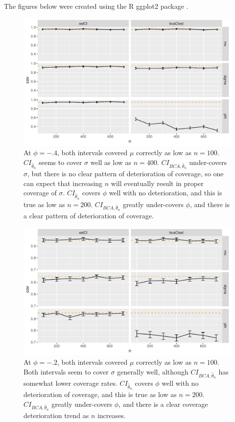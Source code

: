 \documentclass[12pt, letterpaper, titlepage]{article}
\begin{document}
The figures below were created using the R ggplot2 package \citep{ggplot2}.
\begin{figure}[tbp]
  \centering
  \includegraphics[width=\textwidth]{figures/plot_n.4}
  \caption{At $\phi = -.4$, both intervals covered $\mu$ correctly as low as
    $n = 100$. $CI_{\hat{\theta}_{n}}$ seems to cover $\sigma$ well as low as
    $n = 400$. $CI_{BCA, \hat{\theta}_{n}}$ under-covers $\sigma$, but there
    is no clear pattern of deterioration of coverage, so one can expect that
    increasing $n$ will eventually result in proper coverage of $\sigma$.
    $CI_{\hat{\theta}_{n}}$ covers $\phi$ well with no deterioration, and this
    is true as low as $n = 200$. $CI_{BCA, \hat{\theta}_{n}}$ greatly
    under-covers $\phi$, and there is a clear pattern of deterioration of
    coverage.}
  \label{fig:plot_n.4}
\end{figure}


\begin{figure}[tbp]
  \centering
  \includegraphics[width=\textwidth]{figures/plot_n.2}
  \caption{At $\phi = -.2$, both intervals covered $\mu$ correctly as low as
    $n = 100$. Both intervals seem to cover $\sigma$ generally well, although
    $CI_{BCA, \hat{\theta}_{n}}$ has somewhat lower coverage rates.
    $CI_{\hat{\theta}_{n}}$ covers $\phi$ well with no deterioration of
    coverage, and this is true as low as $n = 200$.
    $CI_{BCA, \hat{\theta}_{n}}$ greatly under-covers $\phi$, and there is a
    clear coverage deterioration trend as $n$ increases.}
  \label{fig:plot_n.2}
\end{figure}
\end{document}
